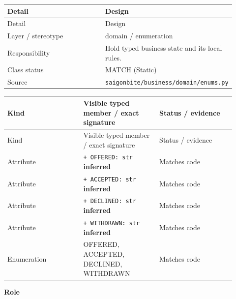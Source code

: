 \begin{longtable}{>{\raggedright\arraybackslash}p{0.4600\linewidth}>{\raggedright\arraybackslash}p{0.4600\linewidth}}
Detail & Design \\
\hline\endfirsthead
Detail & Design \\
\hline\endhead
Layer / stereotype & domain / \guillemotleft{}enumeration\guillemotright{} \\
Responsibility & Hold typed business state and its local rules. \\
Class status & MATCH (Static) \\
Source & \texttt{saigonbite/\allowbreak{}business/\allowbreak{}domain/\allowbreak{}enums.\allowbreak{}py} \\
\end{longtable}
\begin{longtable}{>{\raggedright\arraybackslash}p{0.3067\linewidth}>{\raggedright\arraybackslash}p{0.3067\linewidth}>{\raggedright\arraybackslash}p{0.3067\linewidth}}
Kind & Visible typed member / exact signature & Status / evidence \\
\hline\endfirsthead
Kind & Visible typed member / exact signature & Status / evidence \\
\hline\endhead
Attribute & \texttt{+ OFFERED: str} \textbf{inferred} & Matches code \\
Attribute & \texttt{+ ACCEPTED: str} \textbf{inferred} & Matches code \\
Attribute & \texttt{+ DECLINED: str} \textbf{inferred} & Matches code \\
Attribute & \texttt{+ WITHDRAWN: str} \textbf{inferred} & Matches code \\
Enumeration & OFFERED, ACCEPTED, DECLINED, WITHDRAWN & Matches code \\
\end{longtable}
\textbf{Role}


